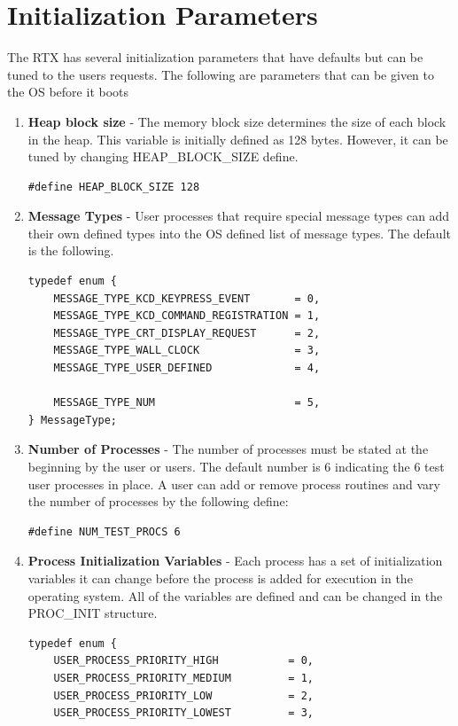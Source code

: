 \documentclass[12pt]{report}
\begin{document}
\section{Initialization Parameters}
The RTX has several initialization parameters that have defaults but can be tuned to the users requests. The following are parameters that can be given to the OS before it boots
\begin{enumerate}
    \item { \bf Heap block size }- The memory block size determines the size of each block in the heap. This variable is initially defined as 128 bytes. However, it can be tuned by changing HEAP\_BLOCK\_SIZE define.
\begin{lstlisting}
#define HEAP_BLOCK_SIZE 128
\end{lstlisting}

    \item { \bf Message Types }- User processes that require special message types can add their own defined types into the OS defined list of message types. The default is the following.
\begin{lstlisting}
typedef enum {
    MESSAGE_TYPE_KCD_KEYPRESS_EVENT       = 0,
    MESSAGE_TYPE_KCD_COMMAND_REGISTRATION = 1,
    MESSAGE_TYPE_CRT_DISPLAY_REQUEST      = 2,
    MESSAGE_TYPE_WALL_CLOCK               = 3,
    MESSAGE_TYPE_USER_DEFINED             = 4,

    MESSAGE_TYPE_NUM                      = 5,
} MessageType;
\end{lstlisting}

    \item { \bf Number of Processes }- The number of processes must be stated at the beginning by the user or users. The default number is 6 indicating the 6 test user processes in place. A user can add or remove process routines and vary the number of processes by the following define:
\begin{lstlisting}
#define NUM_TEST_PROCS 6
\end{lstlisting}

    \item { \bf Process Initialization Variables }- Each process has a set of initialization variables it can change before the process is added for execution in the operating system. All of the variables are defined and can be changed in the PROC\_INIT structure.
\begin{lstlisting}
typedef enum {
    USER_PROCESS_PRIORITY_HIGH           = 0,
    USER_PROCESS_PRIORITY_MEDIUM         = 1,
    USER_PROCESS_PRIORITY_LOW            = 2,
    USER_PROCESS_PRIORITY_LOWEST         = 3,


\end{lstlisting}
\end{enumerate}
\end{document}
